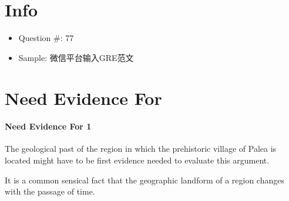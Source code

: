 \documentclass{article}
\begin{document}
  \section{Info}
    \begin{itemize}
      \item Question \#: 77
      \item Sample: 微信平台输入GRE范文
    \end{itemize}

  \section{Need Evidence For}

    \paragraph{Need Evidence For 1} The geological past of the region in which
    the prehistoric village of Palea is located might have to be first
    evidence needed to evaluate this argument.

    It is a common sensical fact that the geographic landform of a region
    changes with the passage of time.
\end{document}
